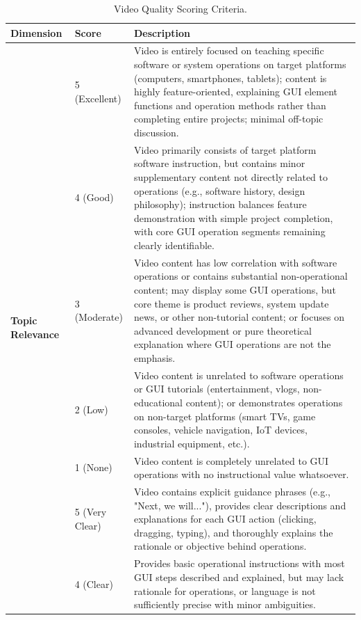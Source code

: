 \documentclass{article}
\theoremstyle{plain}
\theoremstyle{definition}
\theoremstyle{remark}
\begin{document}
\begin{table}[htbp]
\centering
\caption{Video Quality Scoring Criteria.}
\label{tab: video_scoring_criteria}
\begin{tabular}{llp{10cm}} %
\toprule
\textbf{Dimension} & \textbf{Score} & \textbf{Description} \\ %
\midrule
\multirow{10}{*}{\textbf{Topic Relevance}} %
& 5 (Excellent) & Video is entirely focused on teaching specific software or system operations on target platforms (computers, smartphones, tablets); content is highly feature-oriented, explaining GUI element functions and operation methods rather than completing entire projects; minimal off-topic discussion. \\
\cmidrule{2-3}
& 4 (Good) & Video primarily consists of target platform software instruction, but contains minor supplementary content not directly related to operations (e.g., software history, design philosophy); instruction balances feature demonstration with simple project completion, with core GUI operation segments remaining clearly identifiable. \\
\cmidrule{2-3}
& 3 (Moderate) & Video content has low correlation with software operations or contains substantial non-operational content; may display some GUI operations, but core theme is product reviews, system update news, or other non-tutorial content; or focuses on advanced development or pure theoretical explanation where GUI operations are not the emphasis. \\
\cmidrule{2-3}
& 2 (Low) & Video content is unrelated to software operations or GUI tutorials (entertainment, vlogs, non-educational content); or demonstrates operations on non-target platforms (smart TVs, game consoles, vehicle navigation, IoT devices, industrial equipment, etc.). \\
\cmidrule{2-3}
& 1 (None) & Video content is completely unrelated to GUI operations with no instructional value whatsoever. \\
\midrule
\multirow{10}{*}{\textbf{Instruction Clarity}}
& 5 (Very Clear) & Video contains explicit guidance phrases (e.g., "Next, we will..."), provides clear descriptions and explanations for each GUI action (clicking, dragging, typing), and thoroughly explains the rationale or objective behind operations. \\
\cmidrule{2-3}
& 4 (Clear) & Provides basic operational instructions with most GUI steps described and explained, but may lack rationale for operations, or language is not sufficiently precise with minor ambiguities. \\

\end{tabular}
\end{table}
\end{document}
